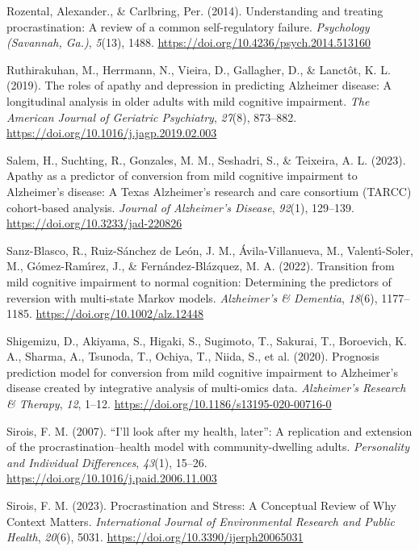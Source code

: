 \documentclass[
]{article}
\newlength{\cslhangindent}
\newenvironment{CSLReferences}[2] %
 {\begin{list}{}{%
  \setlength{\itemindent}{0pt}
  \setlength{\leftmargin}{0pt}
  \setlength{\parsep}{0pt}
  \ifodd #1
   \setlength{\leftmargin}{\cslhangindent}
   \setlength{\itemindent}{-1\cslhangindent}
  \fi
  \setlength{\itemsep}{#2\baselineskip}}}
 {\end{list}}
\begin{document}
\begin{CSLReferences}{1}{0}
Rozental, Alexander., \& Carlbring, Per. (2014). Understanding and
treating procrastination: {A} review of a common self-regulatory
failure. \emph{Psychology (Savannah, Ga.)}, \emph{5}(13), 1488.
\url{https://doi.org/10.4236/psych.2014.513160}

Ruthirakuhan, M., Herrmann, N., Vieira, D., Gallagher, D., \& Lanctôt,
K. L. (2019). The roles of apathy and depression in predicting
{Alzheimer} disease: A longitudinal analysis in older adults with mild
cognitive impairment. \emph{The American Journal of Geriatric
Psychiatry}, \emph{27}(8), 873--882.
\url{https://doi.org/10.1016/j.jagp.2019.02.003}

Salem, H., Suchting, R., Gonzales, M. M., Seshadri, S., \& Teixeira, A.
L. (2023). Apathy as a predictor of conversion from mild cognitive
impairment to {Alzheimer}'s disease: A {Texas Alzheimer}'s research and
care consortium ({TARCC}) cohort-based analysis. \emph{Journal of
Alzheimer's Disease}, \emph{92}(1), 129--139.
\url{https://doi.org/10.3233/jad-220826}

Sanz-Blasco, R., Ruiz-Sánchez de León, J. M., Ávila-Villanueva, M.,
Valentı́-Soler, M., Gómez-Ramı́rez, J., \& Fernández-Blázquez, M. A.
(2022). Transition from mild cognitive impairment to normal cognition:
Determining the predictors of reversion with multi-state {Markov}
models. \emph{Alzheimer's \& Dementia}, \emph{18}(6), 1177--1185.
\url{https://doi.org/10.1002/alz.12448}

Shigemizu, D., Akiyama, S., Higaki, S., Sugimoto, T., Sakurai, T.,
Boroevich, K. A., Sharma, A., Tsunoda, T., Ochiya, T., Niida, S., et al.
(2020). Prognosis prediction model for conversion from mild cognitive
impairment to {Alzheimer}'s disease created by integrative analysis of
multi-omics data. \emph{Alzheimer's Research \& Therapy}, \emph{12},
1--12. \url{https://doi.org/10.1186/s13195-020-00716-0}

Sirois, F. M. (2007). {``{I}'ll look after my health, later''}: {A}
replication and extension of the procrastination--health model with
community-dwelling adults. \emph{Personality and Individual
Differences}, \emph{43}(1), 15--26.
\url{https://doi.org/10.1016/j.paid.2006.11.003}

Sirois, F. M. (2023). Procrastination and {Stress}: {A Conceptual
Review} of {Why Context Matters}. \emph{International Journal of
Environmental Research and Public Health}, \emph{20}(6), 5031.
\url{https://doi.org/10.3390/ijerph20065031}


\end{CSLReferences}
\end{document}
